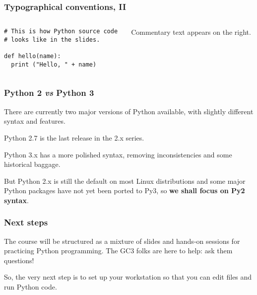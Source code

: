 \documentclass[english,serif,mathserif,xcolor=pdftex,dvipsnames,table]{beamer}
\begin{document}
\begin{frame}[fragile]
  \frametitle{Typographical conventions, II}

    \begin{columns}[t]
    \begin{column}{0.5\textwidth}
\begin{lstlisting}
# This is how Python source code
# looks like in the slides.

def hello(name):
  print ("Hello, " + name)
\end{lstlisting}
    \end{column}
    \begin{column}{0.5\textwidth}
      \raggedleft Commentary text appears on the right.
    \end{column}
  \end{columns}

\end{frame}


\begin{frame}
  \frametitle{Python 2 \emph{vs} Python 3}

  There are currently two major versions of Python available, with
  slightly different syntax and features.

  \+
  Python 2.7 is the last release in the 2.x series. 

  \+
  Python 3.x has a more polished syntax, removing inconsistencies and
  some historical baggage.

  \+ 
  But Python 2.x is still the default on most Linux distributions
  and some major Python packages have not yet been ported to Py3, so
  \textbf{we shall focus on Py2 syntax}.
\end{frame}


\begin{frame}
  \frametitle{Next steps}

  The course will be structured as a mixture of slides and hands-on
  sessions for practicing Python programming.  The GC3 folks are here
  to help: ask them questions!

  \+ 
  So, the very next step is to set up your workstation so that you
  can edit files and run Python code.
\end{frame}
\end{document}

